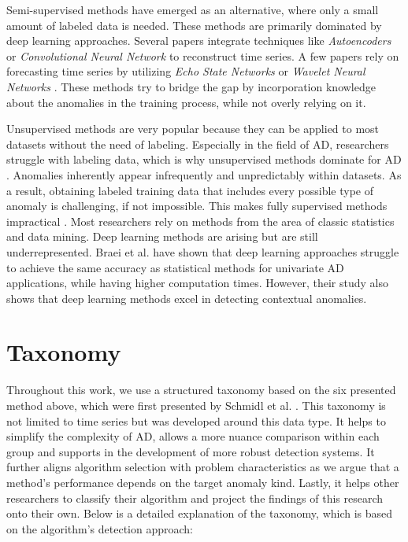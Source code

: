 Semi-supervised methods have emerged as an alternative, where only a small amount of labeled data is needed. These methods are primarily dominated by deep learning approaches. Several papers integrate techniques like \textit{Autoencoders} \cite{Bagel,Donut,IE-CAE} or \textit{Convolutional Neural Network} \cite{SR-CNN} to reconstruct time series. A few papers rely on forecasting time series by utilizing \textit{Echo State Networks} \cite{HealthESN} or \textit{Wavelet Neural Networks} \cite{OceanWNN}. These methods try to bridge the gap by incorporation knowledge about the anomalies in the training process, while not overly relying on it.

Unsupervised methods are very popular because they can be applied to most datasets without the need of labeling. Especially in the field of AD, researchers struggle with labeling data, which is why unsupervised methods dominate for AD \cite{Aggarwal2017}. Anomalies inherently appear infrequently and unpredictably within datasets. As a result, obtaining labeled training data that includes every possible type of anomaly is challenging, if not impossible. This makes fully supervised methods impractical \cite{Pang2021a}. Most researchers rely on methods from the area of classic statistics and data mining. Deep learning methods are arising but are still underrepresented. Braei et al. \cite{Braei2020} have shown that deep learning approaches struggle to achieve the same accuracy as statistical methods for univariate AD applications, while having higher computation times. However, their study also shows that deep learning methods excel in detecting contextual anomalies.

\section{Taxonomy}
\label{sec:taxonomy}
Throughout this work, we use a structured taxonomy based on the six presented method above, which were first presented by Schmidl et al. \cite{Schmidl2022}. This taxonomy is not limited to time series but was developed around this data type. It helps to simplify the complexity of AD, allows a more nuance comparison within each group and supports in the development of more robust detection systems. It further aligns algorithm selection with problem characteristics as we argue that a method's performance depends on the target anomaly kind. Lastly, it helps other researchers to classify their algorithm and project the findings of this research onto their own. Below is a detailed explanation of the taxonomy, which is based on the algorithm's detection approach:

